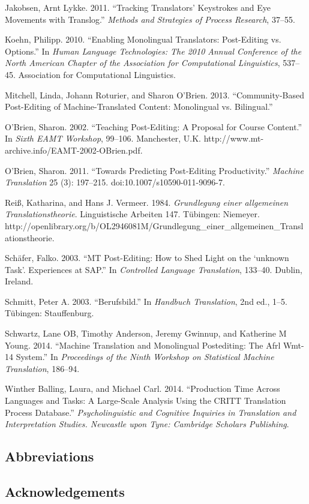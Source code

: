 \documentclass[output=paper]{langsci/langscibook}
\begin{document}
Jakobsen, Arnt Lykke. 2011. “Tracking Translators’ Keystrokes and Eye Movements with Translog.” \textit{Methods and Strategies of Process Research}, 37–55.



Koehn, Philipp. 2010. “Enabling Monolingual Translators: Post-Editing vs. Options.” In \textit{Human Language Technologies: The 2010 Annual Conference of the North American Chapter of the Association for Computational Linguistics}, 537–45. Association for Computational Linguistics.



Mitchell, Linda, Johann Roturier, and Sharon O’Brien. 2013. “Community-Based Post-Editing of Machine-Translated Content: Monolingual vs. Bilingual.”



O’Brien, Sharon. 2002. “Teaching Post-Editing: A Proposal for Course Content.” In \textit{Sixth EAMT Workshop}, 99–106. Manchester, U.K. http://www.mt-archive.info/EAMT-2002-OBrien.pdf.



O’Brien, Sharon. 2011. “Towards Predicting Post-Editing Productivity.” \textit{Machine Translation} 25 (3): 197–215. doi:10.1007/s10590-011-9096-7.



Reiß, Katharina, and Hans J. Vermeer. 1984. \textit{Grundlegung einer allgemeinen Translationstheorie}. Linguistische Arbeiten 147. Tübingen: Niemeyer. http://openlibrary.org/b/OL2946081M/Grundlegung\_einer\_allgemeinen\_Translationstheorie.



Schäfer, Falko. 2003. “MT Post-Editing: How to Shed Light on the ‘unknown Task’. Experiences at SAP.” In \textit{Controlled Language Translation}, 133–40. Dublin, Ireland.



Schmitt, Peter A. 2003. “Berufsbild.” In \textit{Handbuch Translation}, 2nd ed., 1–5. Tübingen: Stauffenburg.



Schwartz, Lane OB, Timothy Anderson, Jeremy Gwinnup, and Katherine M Young. 2014. “Machine Translation and Monolingual Postediting: The Afrl Wmt-14 System.” In \textit{Proceedings of the Ninth Workshop on Statistical Machine Translation}, 186–94.



Winther Balling, Laura, and Michael Carl. 2014. “Production Time Across Languages and Tasks: A Large-Scale Analysis Using the CRITT Translation Process Database.” \textit{Psycholinguistic and Cognitive Inquiries in Translation and Interpretation Studies. Newcastle upon Tyne: Cambridge Scholars Publishing}.



\subsection*{Abbreviations}
\subsection*{Acknowledgements}

\printbibliography[heading=subbibliography,notkeyword=this]
\end{document}
